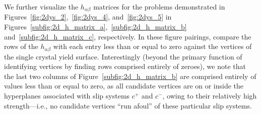 \documentclass[preprint,3p,times,sort&compress,letterpaper,12pt]{elsarticle} %
\begin{document}
We further visualize the $h_{\alpha\beta}$ matrices for the problems demonstrated in Figures~\ref{fig:2dys_2},~\ref{fig:2dys_4}, and~\ref{fig:2dys_5} in Figures~\ref{subfig:2d_h_matrix_a},~\ref{subfig:2d_h_matrix_b} and~\ref{subfig:2d_h_matrix_c}, respectively. In these figure pairings, compare the rows of the $h_{\alpha\beta}$ with each entry less than or equal to zero against the vertices of the single crystal yield surface. Interestingly (beyond the primary function of identifying vertices by finding rows comprised entirely of zeroes), we note that the last two columns of Figure~\ref{subfig:2d_h_matrix_b} are comprised entirely of values less than or equal to zero, as all candidate vertices are on or inside the hyperplanes associated with slip systems $c^+$ and $c^-$, owing to their relatively high strength---i.e., no candidate vertices ``run afoul'' of these particular slip systems.
\end{document}
